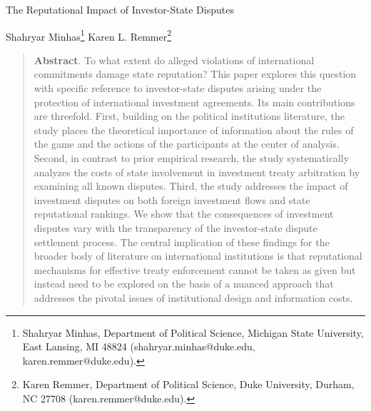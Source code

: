 \documentclass[12pt,onesided]{amsart}
\begin{document}
\thispagestyle{empty}

\begin{center}
{\sc \large The Reputational Impact of Investor-State Disputes}
\end{center}

\vspace{10mm}

\begin{center}
{\sc Shahryar Minhas}\footnote{Shahryar Minhas, Department of Political Science, Michigan State University, East Lansing, MI 48824 (shahryar.minhas@duke.edu, karen.remmer@duke.edu).}
{\sc Karen L. Remmer}\footnote{Karen Remmer, Department of Political Science, Duke University, Durham, NC 27708 (karen.remmer@duke.edu).}
\end{center}

\vspace{20mm}


\begin{quote}
	\noindent \textbf{Abstract}. To what extent do alleged violations of international commitments damage state  reputation? This paper explores this question with specific reference to investor-state disputes arising under the protection  of international investment agreements. Its main contributions are threefold. First, building on the political institutions literature, the study places the theoretical importance of information about the rules of the game and the actions of the participants at the center of analysis. Second, in contrast to prior empirical research, the study systematically analyzes  the costs of state involvement in investment treaty arbitration by examining all known disputes.  Third, the study addresses  the impact of investment disputes on both foreign investment flows and state reputational rankings. We show that the consequences of investment disputes vary with the transparency of the investor-state dispute settlement process. The  central  implication  of these  findings for the  broader  body of literature on international institutions is that  reputational mechanisms  for effective treaty  enforcement  cannot  be taken  as given but  instead  need  to be explored on the basis of a nuanced  approach that  addresses  the pivotal issues of institutional design and information costs.
\end{quote}
 
\end{document}
